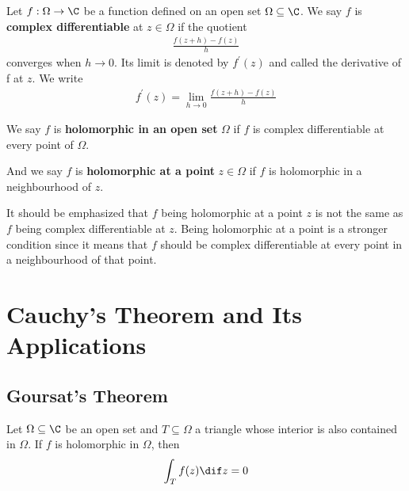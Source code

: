 \documentclass[thmcnt=section, color=cyan, 12pt]{my-elegantbook}
\begin{document}
\begin{definition}
    Let $f: \Omega \to \C$ be a function defined on an open set $\Omega \subseteq \C$.
    We say $f$ is \textbf{complex differentiable}
    at $z \in \Omega$ if the quotient
    \begin{align*}
        \frac{f(z + h) - f(z)}{h}
    \end{align*}
    converges when $h \to 0$.
    Its limit is denoted by $f^\prime(z)$
    and called the derivative of f at $z$.
    We write
    \begin{align*}
        f^\prime(z) = \lim_{h \to 0} \frac{f(z + h) - f(z)}{h}
    \end{align*}

    We say $f$ is \textbf{holomorphic in an open set} $\Omega$
    if $f$ is complex differentiable at every point of $\Omega$.

    And we say $f$ is \textbf{holomorphic at a point} $z \in \Omega$ if $f$ is holomorphic in a neighbourhood of $z$.
\end{definition}

\begin{note}
    It should be emphasized that $f$ being holomorphic at a point $z$
    is not the same as $f$ being complex differentiable at $z$.
    Being holomorphic at a point is a stronger condition since
    it means that $f$ should be complex differentiable
    at every point in a neighbourhood of that point.
\end{note}


\chapter{Cauchy's Theorem and Its Applications}


\section{Goursat's Theorem}

\begin{theorem} \label{thm:4}
    Let $\Omega \subseteq \C$ be an open set and $T \subseteq \Omega$ a triangle whose interior is also contained in $\Omega$.
    If $f$ is holomorphic in $\Omega$, then
    \begin{align*}
        \int_{T} f(z) \dif z = 0
    \end{align*}
\end{theorem}
\end{document}
